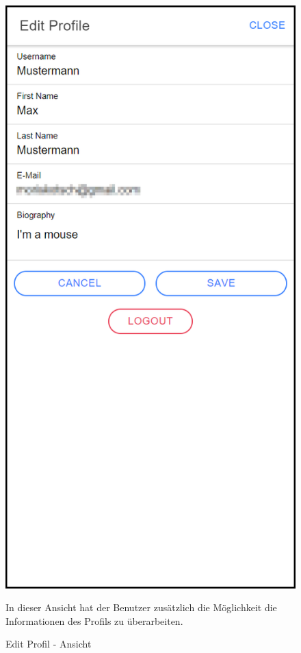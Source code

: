 \begin{figure}[H]
    \centering
    \begin{minipage}{.4\textwidth}
        \begin{center}
            \includegraphics[width=0.8\linewidth]{images/editProfil.png}
        \end{center}
        \caption{Edit Profil - Ansicht}
        \label{fig:editprofil}
    \end{minipage}%
    \begin{minipage}{.6\textwidth}
        \begin{changemargin}{0.5cm}{0cm}            
            In dieser Ansicht hat der Benutzer zusätzlich die Möglichkeit die Informationen des Profils zu überarbeiten.


\end{changemargin}
\end{minipage}
\end{figure}
